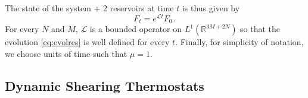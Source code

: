 \documentclass{article}
\newcommand*\R{ \mathds{R} }
\newcommand*\cL{ \mathcal{L} }
\begin{document}
The state of the system + 2 reservoirs at time $t$ is thus given by
\begin{equation}\label{eq:evolres}
F_t=e^{\cL t}F_0\, .
\end{equation}
For every $N$ and $M$, $\cL$ is a bounded operator on $L^1(\R^{3M+2N})$ so that the evolution \eqref{eq:evolres} is 
well defined for every $t$. Finally,
for simplicity of notation, we choose units of time such that $\mu=1$. 


\subsection{Dynamic Shearing Thermostats}\label{subsec:dynamic}
\end{document}
